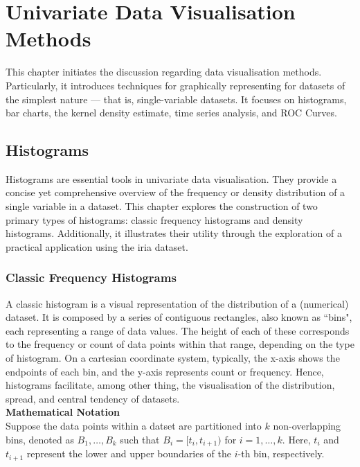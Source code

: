 \documentclass{article}\usepackage[]{graphicx}\usepackage[]{xcolor}
\numberwithin{equation}{section}
\begin{document}
\newpage

\section{Univariate Data Visualisation Methods}

\noindent This chapter initiates the discussion regarding data visualisation methods. Particularly, it introduces techniques for graphically representing for datasets of the simplest nature — that is, single-variable datasets. It focuses on histograms, bar charts, the kernel density estimate, time series analysis, and ROC Curves. 

\subsection{Histograms}

\noindent Histograms are essential tools in univariate data visualisation. They provide a concise yet comprehensive overview of the frequency or density distribution of a single variable in a dataset. This chapter explores the construction of two primary types of histograms: classic frequency histograms and density histograms. Additionally, it illustrates their utility through the exploration of a practical application using the iria dataset.

\subsubsection{Classic Frequency Histograms}

\noindent A classic histogram is a visual representation of the distribution of a (numerical) dataset. It is composed by a series of contiguous rectangles, also known as ``bins", each representing a range of data values. The height of each of these corresponds to the frequency or count of data points within that range, depending on the type of histogram. On a cartesian coordinate system, typically, the x-axis shows the endpoints of each bin, and the y-axis represents count or frequency. Hence, histograms facilitate, among other thing, the visualisation of the distribution, spread, and central tendency of datasets.\\

\noindent \textbf{Mathematical Notation}\\
\noindent Suppose the data points within a datset are partitioned into $k$ non-overlapping bins, denoted as $B_1, \dots, B_k$ such that $B_i = [t_i, t_{i+1})$ for $i = 1, \dots, k$. Here, $t_i$ and $t_{i+1}$ represent the lower and upper boundaries of the $i$-th bin, respectively.\\
\end{document}
